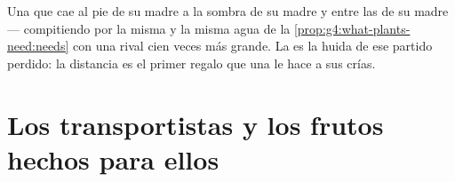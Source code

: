 \begin{example}\label{ex:g6:how-plants-spread:whyleave}
Una  que cae al pie de su madre  a la sombra de su madre
y entre las  de su madre --- compitiendo por la misma  y la
misma agua de la \cref{prop:g4:what-plants-need:needs} con una rival
cien veces más grande. La  es la huida de ese partido
perdido: la distancia es el primer regalo que una  le hace a sus
crías.
\end{example}

\section{Los transportistas y los frutos hechos para ellos}

